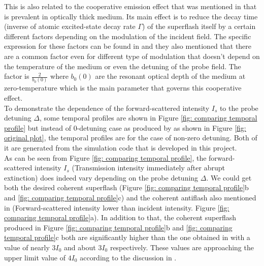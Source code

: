 This is also related to the cooperative emission effect that was mentioned in \cite{Kwong2014, Kwong2015, Kwong2017, Araujo2016} that is prevalent in optically thick medium. Its main effect is to reduce the decay time (inverse of atomic excited-state decay rate $\Gamma$) of the superflash itself by a certain different factors depending on the modulation of the incident field. The specific expression for these factors can be found in \cite{Kwong2017} and they also mentioned that there are a common factor even for different type of modulation that doesn't depend on the temperature of the medium or even the detuning of the probe field. The factor is $\frac{2}{b_{0}(0)}$ where $b_{0}(0)$ are the resonant optical depth of the medium at zero-temperature which is the main parameter that governs this cooperative effect.\\

To demonstrate the dependence of the forward-scattered intensity $I_{s}$ to the probe detuning $\Delta$, some temporal profiles are shown in Figure \ref{fig: comparing temporal profile} but instead of 0-detuning case as produced by \cite{jeong2010slow} as shown in Figure \ref{fig: original plot}, the temporal profiles are for the case of non-zero detuning. Both of it are generated from the simulation code that is developed in this project.\\

As can be seen from Figure \ref{fig: comparing temporal profile}, the forward-scattered intensity $I_{s}$ (Transmission intensity immediately after abrupt extinction) does indeed vary depending on the probe detuning $\Delta$. We could get both the desired coherent superflash (Figure \ref{fig: comparing temporal profile}b and \ref{fig: comparing temporal profile}c) and the coherent antiflash also mentioned in \cite{Kwong2017} (Forward-scattered intensity lower than incident intensity. Figure \ref{fig: comparing temporal profile}a). In addition to that, the coherent superflash produced in Figure \ref{fig: comparing temporal profile}b and \ref{fig: comparing temporal profile}c both are significantly higher than the one obtained in \cite{jeong2010slow} with a value of nearly $3I_{0}$ and about $3I_{0}$ respectively. These values are approaching the upper limit value of $4I_{0}$ according to the discussion in \cite{Kwong2014}.\\

